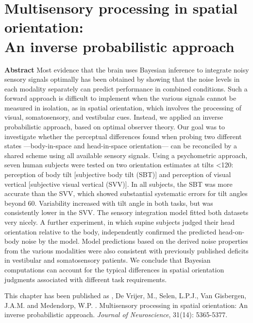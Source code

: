 
\thispagestyle{empty}

\chapter{Multisensory processing in spatial orientation:\\An inverse probabilistic approach}
\chaptermark{}

\newpage

\small {\bf Abstract} Most evidence that the brain uses Bayesian inference to integrate noisy sensory signals optimally has been obtained by showing that the noise levels in each modality separately can predict performance in combined conditions. Such a forward approach is difficult to implement when the various signals cannot be measured in isolation, as in spatial orientation, which involves the processing of visual, somatosensory, and vestibular cues. Instead, we applied an inverse probabilistic approach, based on optimal observer theory. Our goal was to investigate whether the perceptual differences found when probing two different states ---body-in-space and head-in-space orientation--- can be reconciled by a shared scheme using all available sensory signals. Using a psychometric approach, seven human subjects were tested on two orientation estimates at tilts \textless 120\textdegree: perception of body tilt [subjective body tilt (SBT)] and perception of visual vertical [subjective visual vertical (SVV)]. In all subjects, the SBT was more accurate than the SVV, which showed substantial systematic errors for tilt angles beyond 60\textdegree. Variability increased with tilt angle in both tasks, but was consistently lower in the SVV. The sensory integration model fitted both datasets very nicely. A further experiment, in which supine subjects judged their head orientation relative to the body, independently confirmed the predicted head-on-body noise by the model. Model predictions based on the derived noise properties from the various modalities were also consistent with previously published deficits in vestibular and somatosensory patients. We conclude that Bayesian computations can account for the typical differences in spatial orientation judgments associated with different task requirements.

\vfill

\noindent\underline{ \hspace{4cm} }

\noindent This chapter has been published as \newline
{}, De Vrijer, M., Selen, L.P.J., Van Gisbergen, J.A.M. and Medendorp, W.P. \citeyear{clemens2011}. Multisensory processing in spatial orientation: An inverse probabilistic approach. \emph{Journal of Neuroscience}, 31(14): 5365-5377. \newline

\newpage





